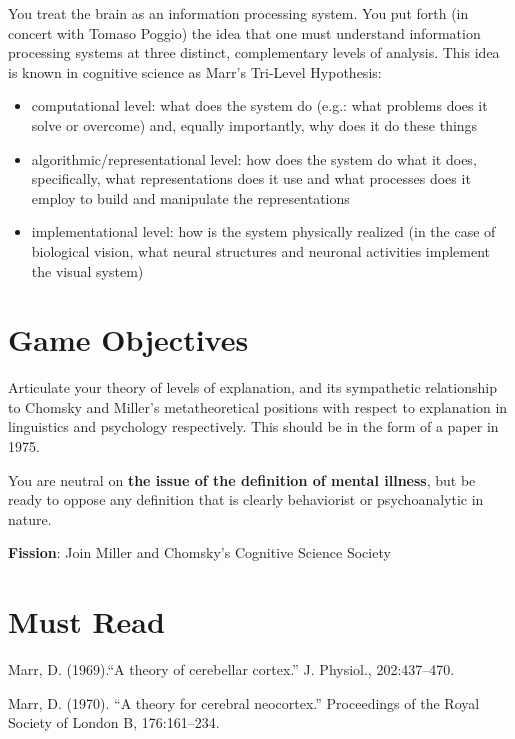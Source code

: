 \begin{refsection}
You treat the brain as an information processing system. You put forth (in concert with Tomaso Poggio) the idea that one must understand information processing systems at three distinct, complementary levels of analysis. This idea is known in cognitive science as Marr's Tri-Level Hypothesis:

\begin{itemize}
\item computational level: what does the system do (e.g.: what problems does it solve or overcome) and, equally importantly, why does it do these things

\item algorithmic\slash representational level: how does the system do what it does, specifically, what representations does it use and what processes does it employ to build and manipulate the representations

\item implementational level: how is the system physically realized (in the case of biological vision, what neural structures and neuronal activities implement the visual system)

\end{itemize}

\section{Game Objectives}
\label{gameobjectives}

Articulate your theory of levels of explanation, and its sympathetic relationship to Chomsky and Miller's metatheoretical positions with respect to explanation in linguistics and psychology respectively. This should be in the form of a paper in 1975.

You are neutral on \textbf{the issue of the definition of mental illness}, but be ready to oppose any definition that is clearly behaviorist or psychoanalytic in nature.

\textbf{Fission}: Join Miller and Chomsky's Cognitive Science Society

\section{Must Read}
\label{mustread}

Marr, D. (1969).``A theory of cerebellar cortex.'' J. Physiol., 202:437--470.

Marr, D. (1970). ``A theory for cerebral neocortex.'' Proceedings of the Royal Society of London B, 176:161--234.


\end{refsection}
